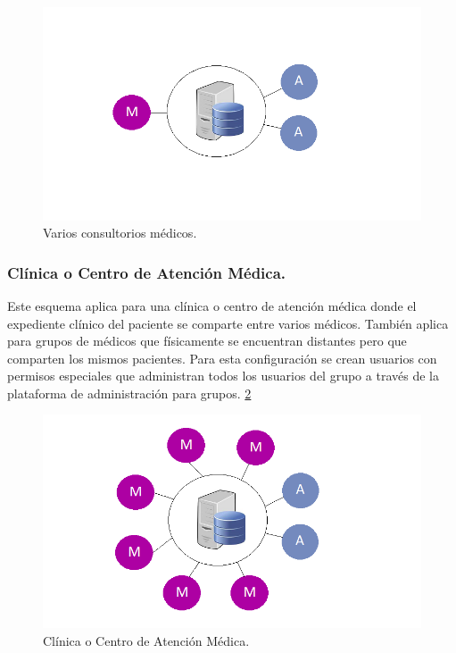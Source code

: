 \begin{figure}[h]
  \label{figura4}
  \centering
  \includegraphics[scale=.35]{lib/assets/4}
  \caption{Varios consultorios médicos.}
\end{figure}



\subsubsection{Clínica o Centro de Atención Médica.}
Este esquema aplica para una clínica o centro de atención médica donde el expediente clínico del paciente se comparte entre varios médicos. También aplica para grupos de médicos que físicamente se encuentran distantes pero que comparten los mismos pacientes. Para esta configuración se crean usuarios con permisos especiales que administran todos los usuarios del grupo a través de la plataforma de administración para grupos. \cite{esquemas} \ref{figura5}

\begin{figure}[h]
  \label{figura5}
  \centering
  \includegraphics[scale=.35]{lib/assets/5}
  \caption{Clínica o Centro de Atención Médica.}
\end{figure}


